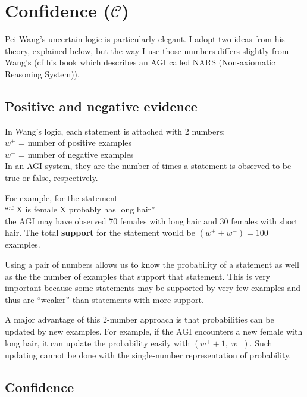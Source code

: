 \chapter{Confidence ($\mathcal{C}$)}
\label{ch:confidence}
\minitoc

Pei Wang's uncertain logic is particularly elegant.  I adopt two ideas from his theory, explained below, but the way I use those numbers differs slightly from Wang's (cf his book \citep*{Wang2006} which describes an AGI called NARS (Non-axiomatic Reasoning System)).

\section{Positive and negative evidence}

In Wang's logic, each statement is attached with 2 numbers:\\
\hspace*{1cm} $w^+$ = number of positive examples\\
\hspace*{1cm} $w^-$ = number of negative examples\\
In an AGI system, they are the number of times a statement is observed to be true or false, respectively.

For example, for the statement\\
\hspace*{1cm} ``if X is female X probably has long hair''\\
the AGI may have observed 70 females with long hair and 30 females with short hair. The total \textbf{support} for the statement would be $(w^+ + w^-) = 100$ examples.

Using a pair of numbers allows us to know the probability of a statement as well as the the number of examples that support that statement. This is very important because some statements may be supported by very few examples and thus are ``weaker'' than statements with more support.

A major advantage of this 2-number approach is that probabilities can be updated by new examples. For example, if the AGI encounters a new female with long hair, it can update the probability easily with $ (w^+ + 1, \;w^-)$. Such updating cannot be done with the single-number representation of probability.

\section{Confidence}

